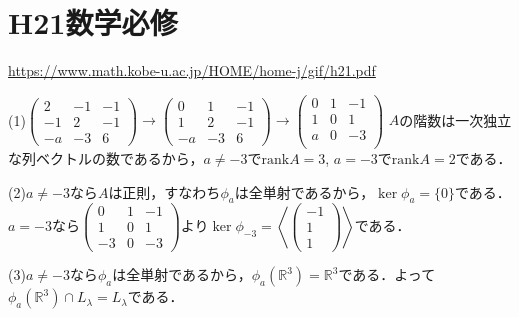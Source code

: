 \documentclass[
		book,
		head_space=20mm,
		foot_space=20mm,
		gutter=10mm,
		line_length=190mm
]{jlreq}
\begin{document}
\section{H21数学必修}
\url{https://www.math.kobe-u.ac.jp/HOME/home-j/gif/h21.pdf}

(1)$\begin{pmatrix}
	2 & -1 & -1 \\
	-1 & 2 & -1 \\
	-a & -3 & 6
\end{pmatrix}\rightarrow \begin{pmatrix}
	0 & 1 & -1 \\
	1 & 2 & -1 \\
	-a & -3 & 6
\end{pmatrix}\rightarrow \begin{pmatrix}
	0 & 1 & -1 \\
	1 & 0 & 1 \\
	a & 0 & -3 \\
	\end{pmatrix}$
	$A$の階数は一次独立な列ベクトルの数であるから，$a\neq -3$で$\mathrm{rank}A=3$, $a=-3$で$\mathrm{rank}A=2$である．

(2)$a\neq -3$なら$A$は正則，すなわち$\phi_a$は全単射であるから，$\ker \phi_a=\{0\}$である．
$a=-3$なら$\begin{pmatrix}
	0 & 1 & -1 \\
	1 & 0 & 1 \\
	-3 & 0 & -3
	\end{pmatrix}$より$\ker \phi_{-3}=\left\langle \begin{pmatrix}
		-1 \\
		1 \\
		1
	\end{pmatrix}\right\rangle$である．

(3)$a\neq -3$なら$\phi_a$は全単射であるから，$\phi_a(\mathbb{R}^3)=\mathbb{R}^3$である．よって$\phi_a(\mathbb{R}^3)\cap L_\lambda=L_\lambda$である．
\end{document}
